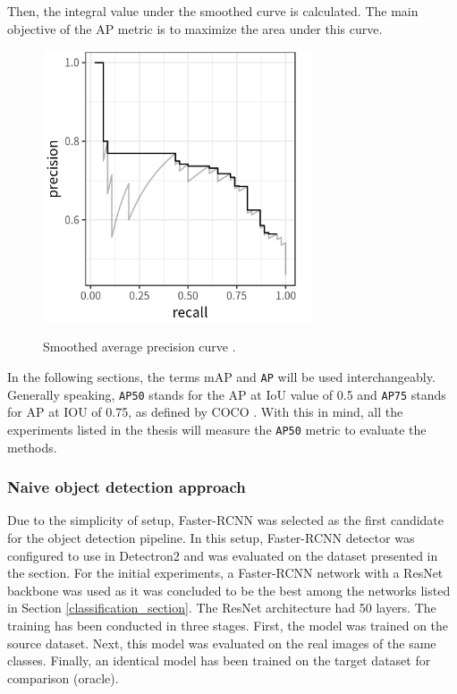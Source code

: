 \FloatBarrier
Then, the integral value under the smoothed curve is calculated. The main objective of the AP  metric is to maximize the area under this curve.

\begin{figure}[htb]
	\begin{center}
		\includegraphics[width=8cm]{./AUC.png}
	\end{center}
	\caption{Smoothed average precision curve \cite{mAp_blog}.}
	\begin{center}
		\label{AUC}
	\end{center}
\end{figure}

In the following sections, the terms mAP and \texttt{AP} will be used interchangeably. Generally speaking, \texttt{AP50} stands for the AP at IoU value of 0.5 and \texttt{AP75} stands for AP at IOU of 0.75, as defined by COCO \cite{Lin2014}. With this in mind, all the experiments listed in the thesis will measure the \texttt{AP50} metric to evaluate the methods. 
\FloatBarrier


\subsubsection{Naive object detection approach}
\label{naive} 
Due to the simplicity of setup, Faster-RCNN \cite{ima} was selected as the first candidate for the object detection pipeline. In this setup, Faster-RCNN detector was configured to use in Detectron2  \cite{wu2019Detectron2} and was evaluated on the  dataset presented in the  section. For the initial experiments, a Faster-RCNN network with a ResNet backbone was used as it was concluded to be the best among the networks listed in Section \ref{classification_section}. The ResNet architecture had 50 layers. The training has been conducted in three stages. First, the model was trained on the source dataset. Next, this model was evaluated on the real images of the same classes. Finally, an identical model has been trained on the target dataset for comparison (oracle). 

